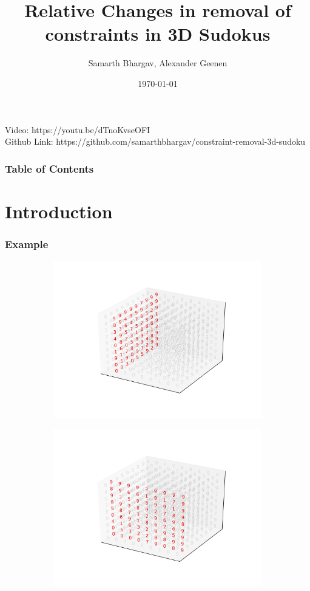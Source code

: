 \documentclass{beamer}
\title{Relative Changes in removal of constraints in 3D Sudokus}
\author{Samarth Bhargav, Alexander Geenen}
\institute{University of Amsterdam}
\date{\today}
\begin{document}
 
\frame{\titlepage}


\begin{frame}[standout]
Video: https://youtu.be/dTnoKvseOFI \\
Github Link: https://github.com/samarthbhargav/constraint-removal-3d-sudoku
\end{frame}
 
\begin{frame}
	\frametitle{Table of Contents}
	\tableofcontents
\end{frame}

\section{Introduction}  


\begin{frame}
\frametitle{Example}
\begin{figure}
	\centering
	\begin{subfigure}[b]{0.4\textwidth}
		\includegraphics[width=\textwidth]{example_orientation_0}
	\end{subfigure}
	\begin{subfigure}[b]{0.4\textwidth}
		\includegraphics[width=\textwidth]{example_orientation_1}
	\end{subfigure}
	

\end{figure}
\end{frame}
\end{document}
